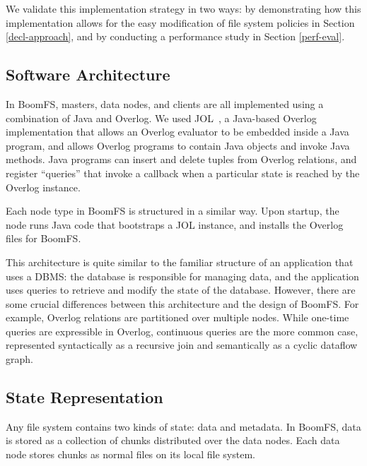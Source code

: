 \documentclass[twocolumn]{article}
\begin{document}
We validate this implementation strategy in two ways: by demonstrating
how this implementation allows for the easy modification of file system
policies in Section \ref{decl-approach}, and by conducting a
performance study in Section \ref{perf-eval}.

\subsection{Software Architecture}

In BoomFS, masters, data nodes, and clients are all implemented using
a combination of Java and Overlog. We used JOL~\cite{jol}, a
Java-based Overlog implementation that allows an Overlog evaluator to
be embedded inside a Java program, and allows Overlog programs to
contain Java objects and invoke Java methods. Java programs can insert
and delete tuples from Overlog relations, and register ``queries''
that invoke a callback when a particular state is reached by the
Overlog instance.

Each node type in BoomFS is structured in a similar way. Upon startup,
the node runs Java code that bootstraps a JOL instance, and installs
the Overlog files for BoomFS.

This architecture is quite similar to the familiar structure of an
application that uses a DBMS: the database is responsible for managing
data, and the application uses queries to retrieve and modify the
state of the database. However, there are some crucial differences
between this architecture and the design of BoomFS. For example,
Overlog relations are partitioned over multiple nodes.  While one-time
queries are expressible in Overlog, continuous queries are the more
common case, represented syntactically as a recursive join and
semantically as a cyclic dataflow graph.

\subsection{State Representation}
Any file system contains two kinds of state: data and metadata. In
BoomFS, data is stored as a collection of chunks distributed over the
data nodes. Each data node stores chunks as normal files on its
local file system.
\end{document}
